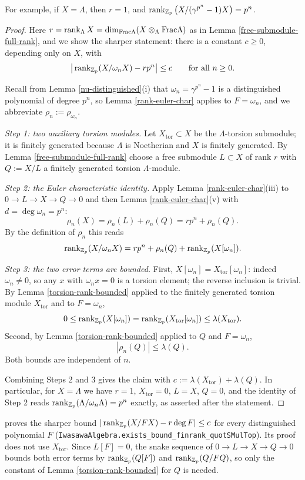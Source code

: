 For example, if $X=\Lambda$, then $r=1$,
and $\operatorname{rank}_{{\mathbb {Z}}_p}\big(X/(\gamma^{p^n}-1)X\big)=p^n$.

\begin{proof}
\leanok
Here $r=\operatorname{rank}_\Lambda X=\dim_{{\mathrm{Frac}}\Lambda}(X\otimes_\Lambda{\mathrm{Frac}}\Lambda)$ as in
Lemma \ref{free-submodule-full-rank}, and we show the sharper statement: there is
a constant $c\geq 0$, depending only on $X$, with
$$\big|\operatorname{rank}_{{\mathbb {Z}}_p}(X/\omega_nX)-rp^n\big|\leq c\qquad\text{for all }n\geq 0 .$$

Recall from Lemma \ref{nu-distinguished}(i) that $\omega_n=\gamma^{p^n}-1$ is a
distinguished polynomial of degree $p^n$, so
Lemma \ref{rank-euler-char} applies to $F=\omega_n$, and we abbreviate
$\rho_n:=\rho_{\omega_n}$.

\emph{Step 1: two auxiliary torsion modules.}
Let $X_{\mathrm{tor}}\subset X$ be the $\Lambda$-torsion submodule; it is
finitely generated because $\Lambda$ is Noetherian and $X$ is finitely generated.
By Lemma \ref{free-submodule-full-rank} choose a free submodule $L\subset X$ of
rank $r$ with $Q:=X/L$ a finitely generated torsion $\Lambda$-module.

\emph{Step 2: the Euler characteristic identity.}
Apply Lemma \ref{rank-euler-char}(iii) to $0\to L\to X\to Q\to 0$ and then
Lemma \ref{rank-euler-char}(v) with $d=\deg\omega_n=p^n$:
$$\rho_n(X)=\rho_n(L)+\rho_n(Q)=rp^n+\rho_n(Q).$$
By the definition of $\rho_n$ this reads
$$\operatorname{rank}_{{\mathbb {Z}}_p}(X/\omega_nX)=rp^n+\rho_n(Q)+\operatorname{rank}_{{\mathbb {Z}}_p}(X[\omega_n]).$$

\emph{Step 3: the two error terms are bounded.}
First, $X[\omega_n]=X_{\mathrm{tor}}[\omega_n]$: indeed $\omega_n\neq 0$, so any
$x$ with $\omega_nx=0$ is a torsion element; the reverse inclusion is trivial.
By Lemma \ref{torsion-rank-bounded} applied to the finitely generated torsion
module $X_{\mathrm{tor}}$ and to $F=\omega_n$,
$$0\leq\operatorname{rank}_{{\mathbb {Z}}_p}(X[\omega_n])=\operatorname{rank}_{{\mathbb {Z}}_p}(X_{\mathrm{tor}}[\omega_n])
\leq\lambda(X_{\mathrm{tor}}).$$
Second, by Lemma \ref{torsion-rank-bounded} applied to $Q$ and $F=\omega_n$,
$$|\rho_n(Q)|\leq\lambda(Q).$$
Both bounds are independent of $n$.

Combining Steps 2 and 3 gives the claim with
$c:=\lambda(X_{\mathrm{tor}})+\lambda(Q)$.
In particular, for $X=\Lambda$ we have $r=1$, $X_{\mathrm{tor}}=0$, $L=X$,
$Q=0$, and the identity of Step 2 reads
$\operatorname{rank}_{{\mathbb {Z}}_p}(\Lambda/\omega_n\Lambda)=p^n$ exactly, as asserted after the
statement.
\end{proof}

\begin{remark}
{\Lean} proves the sharper bound $|\operatorname{rank}_{{\mathbb {Z}}_p}(X/FX)-r\deg F|\leq c$ for every
distinguished polynomial $F$
(\texttt{IwasawaAlgebra.exists\_bound\_finrank\_quotSMulTop}). Its proof does
not use $X_{\mathrm{tor}}$. Since $L[F]=0$, the snake sequence of $0\to L\to
X\to Q\to0$ bounds both error terms by $\operatorname{rank}_{{\mathbb {Z}}_p}(Q[F])$ and
$\operatorname{rank}_{{\mathbb {Z}}_p}(Q/FQ)$, so only the constant of Lemma \ref{torsion-rank-bounded}
for $Q$ is needed.
\end{remark}

